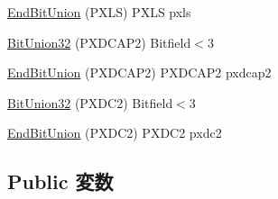 \begin{DoxyCompactItemize}
\item 
\hyperlink{structPXCAP_adfb99c076777a304d897f2649b9c2a26}{EndBitUnion} (PXLS) PXLS pxls
\item 
\hyperlink{structPXCAP_a1969e3af69aa02aaa2a1c19bcc17d320}{BitUnion32} (PXDCAP2) Bitfield$<$3
\item 
\hyperlink{structPXCAP_ae71458be616fb78117c85348a465f94b}{EndBitUnion} (PXDCAP2) PXDCAP2 pxdcap2
\item 
\hyperlink{structPXCAP_a2d8b31c22246e7fa8634ccf6d2cd33da}{BitUnion32} (PXDC2) Bitfield$<$3
\item 
\hyperlink{structPXCAP_a20b167582976c8157702b6bab885255e}{EndBitUnion} (PXDC2) PXDC2 pxdc2
\end{DoxyCompactItemize}
\subsection*{Public 変数}
